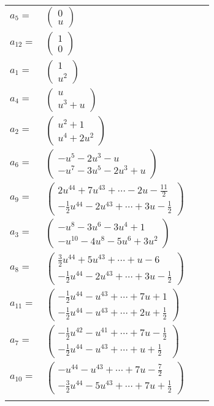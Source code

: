 \documentclass[1p]{elsarticle_modified}
\theoremstyle{definition}
\begin{document}
\begin{tabular}{m{7pt} m{180pt} m{7pt} m{180pt} }
\flushright $a_{5}=$&$\begin{pmatrix}0\\u\end{pmatrix}$ \\
\flushright $a_{12}=$&$\begin{pmatrix}1\\0\end{pmatrix}$ \\
\flushright $a_{1}=$&$\begin{pmatrix}1\\u^2\end{pmatrix}$ \\
\flushright $a_{4}=$&$\begin{pmatrix}u\\u^3+u\end{pmatrix}$ \\
\flushright $a_{2}=$&$\begin{pmatrix}u^2+1\\u^4+2 u^2\end{pmatrix}$ \\
\flushright $a_{6}=$&$\begin{pmatrix}- u^5-2 u^3- u\\- u^7-3 u^5-2 u^3+u\end{pmatrix}$ \\
\flushright $a_{9}=$&$\begin{pmatrix}2 u^{44}+7 u^{43}+\cdots-2 u-\frac{11}{2}\\-\frac{1}{2} u^{44}-2 u^{43}+\cdots+3 u-\frac{1}{2}\end{pmatrix}$ \\
\flushright $a_{3}=$&$\begin{pmatrix}- u^8-3 u^6-3 u^4+1\\- u^{10}-4 u^8-5 u^6+3 u^2\end{pmatrix}$ \\
\flushright $a_{8}=$&$\begin{pmatrix}\frac{3}{2} u^{44}+5 u^{43}+\cdots+u-6\\-\frac{1}{2} u^{44}-2 u^{43}+\cdots+3 u-\frac{1}{2}\end{pmatrix}$ \\
\flushright $a_{11}=$&$\begin{pmatrix}-\frac{1}{2} u^{44}- u^{43}+\cdots+7 u+1\\-\frac{1}{2} u^{44}- u^{43}+\cdots+2 u+\frac{1}{2}\end{pmatrix}$ \\
\flushright $a_{7}=$&$\begin{pmatrix}-\frac{1}{2} u^{42}- u^{41}+\cdots+7 u-\frac{1}{2}\\-\frac{1}{2} u^{44}- u^{43}+\cdots+u+\frac{1}{2}\end{pmatrix}$ \\
\flushright $a_{10}=$&$\begin{pmatrix}- u^{44}- u^{43}+\cdots+7 u-\frac{7}{2}\\-\frac{3}{2} u^{44}-5 u^{43}+\cdots+7 u+\frac{1}{2}\end{pmatrix}$\\&\end{tabular}
\end{document}
